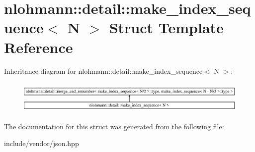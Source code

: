 \hypertarget{structnlohmann_1_1detail_1_1make__index__sequence}{}\section{nlohmann\+:\+:detail\+:\+:make\+\_\+index\+\_\+sequence$<$ N $>$ Struct Template Reference}
\label{structnlohmann_1_1detail_1_1make__index__sequence}
Inheritance diagram for nlohmann\+:\+:detail\+:\+:make\+\_\+index\+\_\+sequence$<$ N $>$\+:\begin{figure}[H]
\begin{center}
\leavevmode
\includegraphics[height=1.597718cm]{d9/d0e/structnlohmann_1_1detail_1_1make__index__sequence}
\end{center}
\end{figure}


The documentation for this struct was generated from the following file\+:\begin{DoxyCompactItemize}
\item 
include/vendor/json.\+hpp\end{DoxyCompactItemize}
